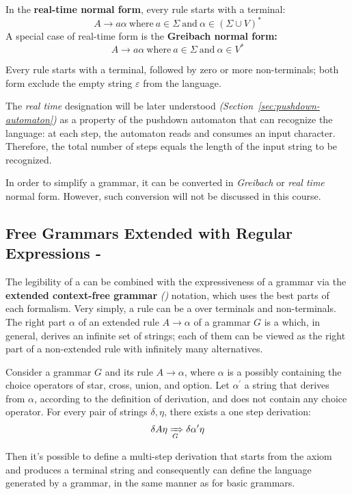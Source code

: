 \documentclass[english]{article}
\begin{document}
In the \textbf{real-time normal form}, every rule starts with a terminal:
\[A \rightarrow a \alpha \ \text{where} \ a \in \Sigma \ \text{and} \ \alpha \in \left( \Sigma \cup V \right)^\ast \]
A special case of real-time form is the \textbf{Greibach normal form:}
\[ A \rightarrow a \alpha \ \text{where} \ a \in \Sigma \ \text{and} \ \alpha \in V^\ast \]

Every rule starts with a terminal, followed by zero or more non-terminals;
both form exclude the empty string \(\varepsilon\) from the language.

The \textit{real time} designation will be later understood \textit{(Section~\ref{sec:pushdown-automaton})} as a property of the pushdown automaton that can recognize the language:
at each step, the automaton reads and consumes an input character.
Therefore, the total number of steps equals the length of the input string to be recognized.

In order to simplify a grammar, it can be converted in \textit{Greibach} or \textit{real time} normal form.
However, such conversion will not be discussed in this course.

\subsection{Free Grammars Extended with Regular Expressions - \EBNF}
\label{sec:free-grammars-extended-with-regular-expressions}

The legibility of a \re can be combined with the expressiveness of a grammar via the \textbf{extended context-free grammar} \textit{(\EBNF)} notation, which uses the best parts of each formalism.
Very simply, a rule \RP can be a \re over terminals and non-terminals.
The right part \(\alpha\) of an extended rule \(A \rightarrow \alpha\) of a grammar \(G\) is a \re which, in general, derives an infinite set of strings;
each of them can be viewed as the right part of a non-extended rule with infinitely many alternatives.

Consider a grammar \(G\) and its rule \(A \rightarrow \alpha\), where \(\alpha\) is a \re possibly containing the choice operators of star, cross, union, and option.
Let \(\alpha^\prime\) a string that derives from \(\alpha\), according to the definition of \re derivation, and does not contain any choice operator.
For every pair of strings \(\delta, \eta\), there exists a one step derivation:
\[ \delta A \eta \xRightarrow[G]{} \delta \alpha^\prime \eta \]

Then it's possible to define a multi-step derivation that starts from the axiom and produces a terminal string and consequently can define the language generated by a \EBNF grammar, in the same manner as for basic grammars.
\end{document}
